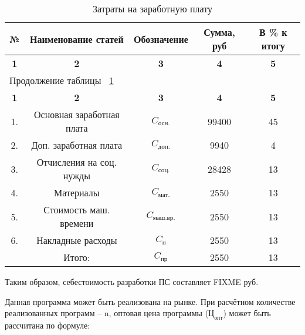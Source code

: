 \begin{center}
\begin{longtable}{|c|c|c|c|c|}
\caption{Затраты на заработную плату} \label{tab:eco_smeta} \\ \hline
\multicolumn{1}{|c|}{\textbf{№}} & \multicolumn{1}{c|}{\textbf{Наименование статей}} & 
\multicolumn{1}{c|}{\textbf{Обозначение}} &   \multicolumn{1}{c|}{\textbf{Сумма, руб}} & 
\multicolumn{1}{c|}{\textbf{В \% к итогу}} \\ \hline

\multicolumn{1}{|c|}{\textbf{1}} &   \multicolumn{1}{c|}{\textbf{2}} & 
\multicolumn{1}{c|}{\textbf{3}} &   \multicolumn{1}{c|}{\textbf{4}} & 
\multicolumn{1}{c|}{\textbf{5}} \\ \hline
\endfirsthead

\multicolumn{5}{|l|}{{Продолжение таблицы ~\ref{tab:eco_smeta}}} \\ %
\hline
\multicolumn{1}{|c|}{\textbf{1}} &   \multicolumn{1}{c|}{\textbf{2}} & 
\multicolumn{1}{c|}{\textbf{3}} &   \multicolumn{1}{c|}{\textbf{4}} & 
\multicolumn{1}{c|}{\textbf{5}} \\ \hline
\endhead

\endfoot

\hline
\endlastfoot

1. & Основная заработная плата & ${C_{\mbox{осн.}}}$ & 99400 & 45 \\ \hline
2. & Доп. заработная плата & ${C_{\mbox{доп.}}}$ & 9940 & 4 \\ \hline
3. & Отчисления на соц. нужды & ${C_{\mbox{соц.}}}$ & 28428 & 13 \\ \hline
4. & Материалы & ${C_{\mbox{мат.}}}$ & 2550 & 13 \\ \hline
5. & Стоимость маш. времени & ${C_{\mbox{маш.вр.}}}$ & 2550 & 13 \\ \hline
6. & Накладные расходы & ${C_{\mbox{н}}}$ & 2550 & 13 \\ \hline
   & Итого: & ${C_{\mbox{пр}}}$ & 2550 & 13 \\ 

\hline

\end{longtable}
\end{center}

Таким образом, себестоимость разработки ПС составляет FIXME руб.

Данная программа может быть реализована на рынке. При расчётном количестве реализованных программ – n, оптовая цена программы
(${\mbox{Ц}_{\mbox{опт}}}$) может быть рассчитана по формуле:

